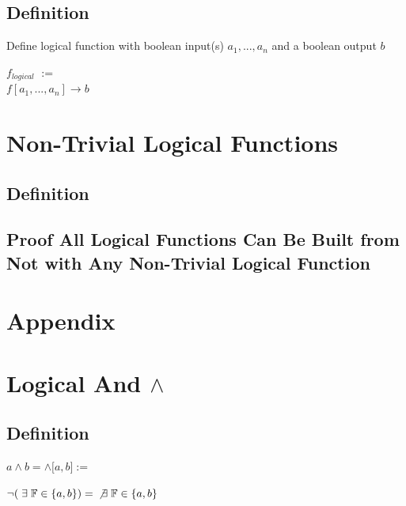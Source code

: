 \documentclass[11pt]{article}
\begin{document}
\subsection{Definition}
Define logical function with boolean input(s) $a_1,...,a_n$ and a boolean output $b$
\begin{center}
$f_{logical}$ $:=$\\
$f[a_1,...,a_n] \rightarrow b$
\end{center}




\section{Non-Trivial Logical Functions}
\subsection{Definition}
\subsection{Proof All Logical Functions Can Be Built from Not with Any Non-Trivial Logical Function}


















\newpage
\section*{Appendix}

\section{Logical And $\land$}
\subsection{Definition}
\begin{center}
$a \land b = \land \lbrack{a,b}\rbrack :=$
\end{center}
\begin{center}
$\lnot (\hspace{1mm} \exists \hspace{1mm} \mathbb{F} \in \{a,b\}) =$
$\not \exists \hspace{1mm} \mathbb{F} \in \{a,b\}$
\end{center}
\end{document}
